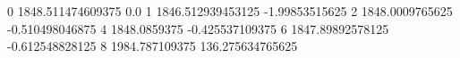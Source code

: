 0 1848.511474609375 0.0
1 1846.512939453125 -1.99853515625
2 1848.0009765625 -0.510498046875
4 1848.0859375 -0.425537109375
6 1847.89892578125 -0.612548828125
8 1984.787109375 136.275634765625
